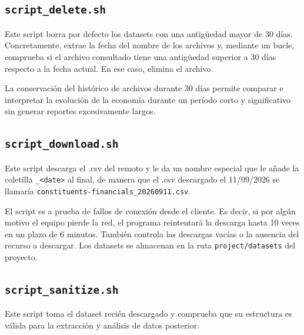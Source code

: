 \documentclass[11pt,a4paper]{article}
\begin{document}
\subsection{\texttt{script\_delete.sh}}

Este script borra por defecto los datasets con una antigüedad mayor de 30 días. Concretamente, extrae la fecha del nombre de los archivos y, mediante un bucle, comprueba si el archivo consultado tiene una antigüedad superior a 30 días respecto a la fecha actual. En ese caso, elimina el archivo.

La conservación del histórico de archivos durante 30 días permite comparar e interpretar la evolución de la economía durante un período corto y significativo sin generar reportes excesivamente largos.



\subsection{\texttt{script\_download.sh}}

Este script descarga el .csv del remoto y le da un nombre especial que le añade la coletilla \texttt{\_<date>} al final, de manera que el .csv descargado el 11/09/2026 se llamaría \texttt{constituents-financials\_20260911.csv}. 

El script es a prueba de fallos de conexión desde el cliente. Es decir, si por algún motivo el equipo pierde la red, el programa reintentará la descarga hasta 10 veces en un plazo de 6 minutos. También controla las descargas vacías o la ausencia del recurso a descargar. Los datasets se almacenan en la ruta \texttt{project/datasets} del proyecto.

\subsection{\texttt{script\_sanitize.sh}}

Este script toma el dataset recién descargado y comprueba que su estructura es válida para la extracción y análisis de datos posterior.
\end{document}
